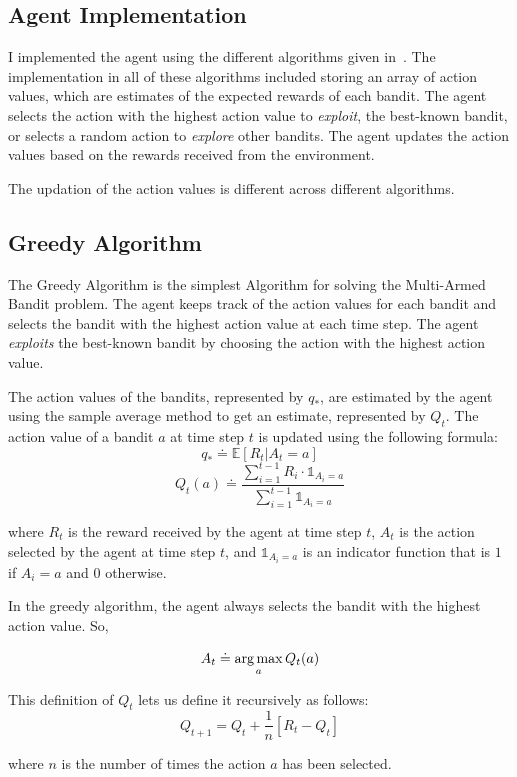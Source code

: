 \subsection{Agent Implementation}

I implemented the agent using the different algorithms given in~\cite{sutton2018reinforcement}. The implementation in all of these algorithms included storing an array of action values, which are estimates of the expected rewards of each bandit. The agent selects the action with the highest action value to \textit{exploit}, the best-known bandit, or selects a random action to \textit{explore} other bandits. The agent updates the action values based on the rewards received from the environment.

The updation of the action values is different across different algorithms.

\subsection{Greedy Algorithm}

The Greedy Algorithm is the simplest Algorithm for solving the Multi-Armed Bandit problem. The agent keeps track of the action values for each bandit and selects the bandit with the highest action value at each time step. The agent \textit{exploits} the best-known bandit by choosing the action with the highest action value.

The action values of the bandits, represented by $q_{\ast}$, are estimated by the agent using the sample average method to get an estimate, represented by $Q_t$. The action value of a bandit $a$ at time step $t$ is updated using the following formula:
\[q_\ast\doteq \mathds{E} [R_t|A_t=a]\]
\[Q_t(a)\doteq \frac{\sum_{i=1}^{t-1} R_i \cdot \mathds{1}_{A_i=a}}{\sum_{i=1}^{t-1} \mathds{1}_{A_i=a}}\]

where $R_t$ is the reward received by the agent at time step $t$, $A_t$ is the action selected by the agent at time step $t$, and $\mathds{1}_{A_i=a}$ is an indicator function that is $1$ if $A_i=a$ and $0$ otherwise.

In the greedy algorithm, the agent always selects the bandit with the highest action value. So,

\[A_t \doteq \operatorname*{arg\,max}_{a} Q_t(a)\]

This definition of $Q_t$ lets us define it recursively as follows:
\[Q_{t+1} = Q_t + \frac{1}{n}[R_t - Q_t]\]

where $n$ is the number of times the action $a$ has been selected.

